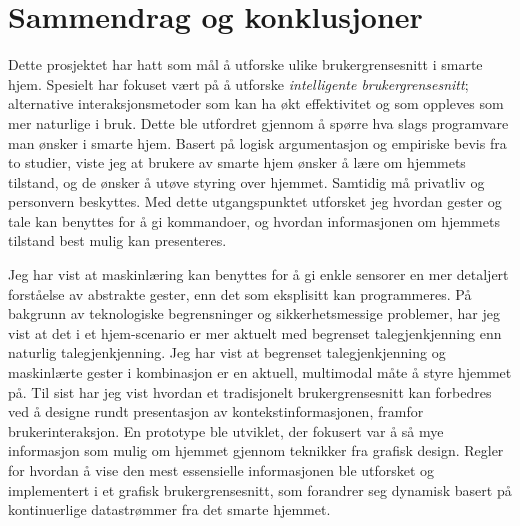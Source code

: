 \section*{Sammendrag og konklusjoner}
Dette prosjektet har hatt som mål å utforske ulike brukergrensesnitt i smarte hjem. Spesielt har fokuset vært på å utforske \emph{intelligente brukergrensesnitt}; alternative interaksjonsmetoder som kan ha økt effektivitet og som oppleves som mer naturlige i bruk. Dette ble utfordret gjennom å spørre hva slags programvare man ønsker i smarte hjem. Basert på logisk argumentasjon og empiriske bevis fra to studier, viste jeg at brukere av smarte hjem ønsker å lære om hjemmets tilstand, og de ønsker å utøve styring over hjemmet. Samtidig må privatliv og personvern beskyttes. Med dette utgangspunktet utforsket jeg hvordan gester og tale kan benyttes for å gi kommandoer, og hvordan informasjonen om hjemmets tilstand best mulig kan presenteres.

Jeg har vist at maskinlæring kan benyttes for å gi enkle sensorer en mer detaljert forståelse av abstrakte gester, enn det som eksplisitt kan programmeres. På bakgrunn av teknologiske begrensninger og sikkerhetsmessige problemer, har jeg vist at det i et hjem-scenario er mer aktuelt med begrenset talegjenkjenning enn naturlig talegjenkjenning. Jeg har vist at begrenset talegjenkjenning og maskinlærte gester i kombinasjon er en aktuell, multimodal måte å styre hjemmet på. Til sist har jeg vist hvordan et tradisjonelt brukergrensesnitt kan forbedres ved å designe rundt presentasjon av kontekstinformasjonen, framfor brukerinteraksjon. En prototype ble utviklet, der fokusert var å så mye informasjon som mulig om hjemmet gjennom teknikker fra grafisk design. Regler for hvordan å vise den mest essensielle informasjonen ble utforsket og implementert i et grafisk brukergrensesnitt, som forandrer seg dynamisk basert på kontinuerlige datastrømmer fra det smarte hjemmet.